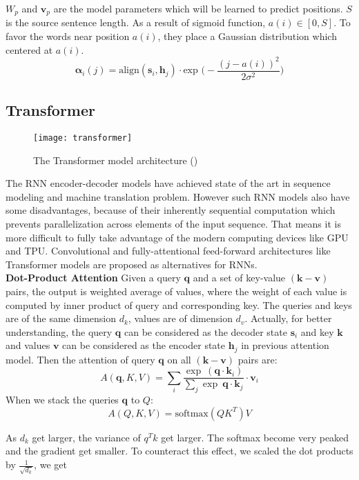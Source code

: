 ${W_p}$ and ${\bm{v}_p}$ are the model parameters which will be learned to predict positions. $S$ is the source sentence length. As a result of sigmoid function, $a(i) \in [0, S]$. To favor the words near position ${a(i)}$, they place a Gaussian distribution which centered at ${a(i)}$.
\[\bm{\alpha}_i(j) = \text{align}(\bm{s}_i, {\bm{h}}_j) \cdot \text{exp\ }\Big(-\frac{(j-a(i))^2}{2 \sigma^2}\Big) \]

\subsection{Transformer}
\begin{figure}[t]
	\texttt{[image: transformer]}
	\caption{The Transformer model architecture (\cite{vaswani2017attention})}
	\centering
\end{figure}
The RNN encoder-decoder models have achieved state of the art in sequence modeling and machine translation problem. However such RNN models also have some disadvantages, because of their inherently sequential computation which prevents parallelization across elements of the input sequence. That means it is more difficult to fully take advantage of the modern computing devices like GPU and TPU. Convolutional \cite{gehring2017convolutional} and fully-attentional feed-forward architectures like Transformer \cite{vaswani2017attention} models are proposed as alternatives for RNNs. \\

\textbf{Dot-Product Attention}
Given a query $\bm{q}$ and a set of key-value $(\bm{k}-\bm{v})$ pairs, the output is weighted average of values, where the weight of each value is computed by inner product of query and corresponding key. The queries and keys are of the same dimension ${d_k}$, values are of dimension ${d_v}$. Actually, for better understanding, the query $\bm{q}$  can be considered as the decoder state $\bm{s}_i$ and key $\bm{k}$ and values $\bm{v}$ can be considered as the encoder state $\bm{h}_j$ in previous attention model. Then the attention of query $\bm{q}$ on all $(\bm{k}-\bm{v})$ pairs are:
\[ A(\bm{q}, K, V) = \sum_{i}{ \frac{\exp\ ({\bm{q}\cdot \bm{k}_i})}{\sum_{j} \exp\ {\bm{q}\cdot \bm{k}_j} } \cdot \bm{v}_i}\]
When we stack the queries ${\bm{q}}$ to ${Q}$:
\[ A(Q, K, V) = \text{softmax}(QK^T)V\]

As ${d_k}$ get larger, the variance of ${q^T k}$ get larger.  The softmax become very peaked and the gradient get smaller. To counteract this effect, we scaled the dot products by ${\frac{1}{\sqrt{d_k}}}$, we get

